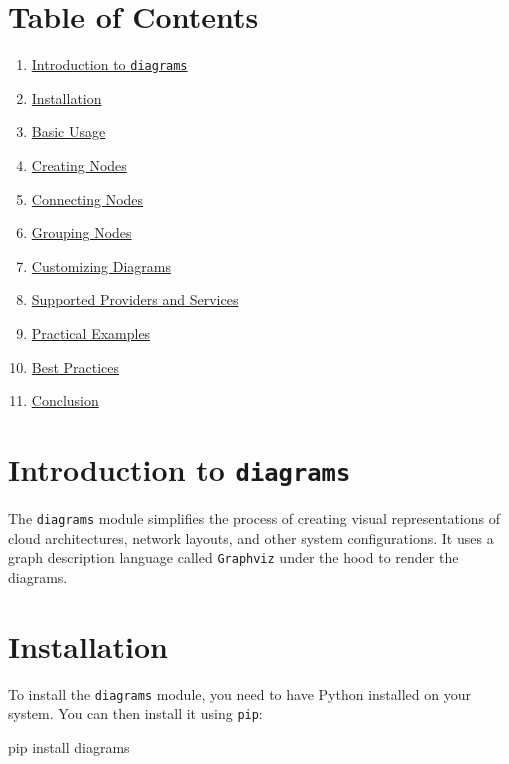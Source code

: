 \documentclass[
  letterpaper,
  DIV=11,
  numbers=noendperiod]{scrreprt}
\newenvironment{Shaded}{\begin{snugshade}}{\end{snugshade}}
\newcommand{\ExtensionTok}[1]{\textcolor[rgb]{0.00,0.23,0.31}{#1}}
\newcommand{\NormalTok}[1]{\textcolor[rgb]{0.00,0.23,0.31}{#1}}
\providecommand{\tightlist}{%
  \setlength{\itemsep}{0pt}\setlength{\parskip}{0pt}}\usepackage{longtable,booktabs,array}
\begin{document}
\section{Table of Contents}\label{table-of-contents-14}

\begin{enumerate}
\def\labelenumi{\arabic{enumi}.}
\tightlist
\item
  \hyperref[introduction-to-diagrams]{Introduction to \texttt{diagrams}}
\item
  \hyperref[installation]{Installation}
\item
  \hyperref[basic-usage]{Basic Usage}
\item
  \hyperref[creating-nodes]{Creating Nodes}
\item
  \hyperref[connecting-nodes]{Connecting Nodes}
\item
  \hyperref[grouping-nodes]{Grouping Nodes}
\item
  \hyperref[customizing-diagrams]{Customizing Diagrams}
\item
  \hyperref[supported-providers-and-services]{Supported Providers and
  Services}
\item
  \hyperref[practical-examples]{Practical Examples}
\item
  \hyperref[best-practices]{Best Practices}
\item
  \hyperref[conclusion]{Conclusion}
\end{enumerate}

\section{\texorpdfstring{Introduction to
\texttt{diagrams}}{Introduction to diagrams}}\label{introduction-to-diagrams}

The \texttt{diagrams} module simplifies the process of creating visual
representations of cloud architectures, network layouts, and other
system configurations. It uses a graph description language called
\texttt{Graphviz} under the hood to render the diagrams.

\section{Installation}\label{installation-1}

To install the \texttt{diagrams} module, you need to have Python
installed on your system. You can then install it using \texttt{pip}:

\begin{Shaded}
\begin{Highlighting}[]
\ExtensionTok{pip}\NormalTok{ install diagrams}
\end{Highlighting}
\end{Shaded}
\end{document}
